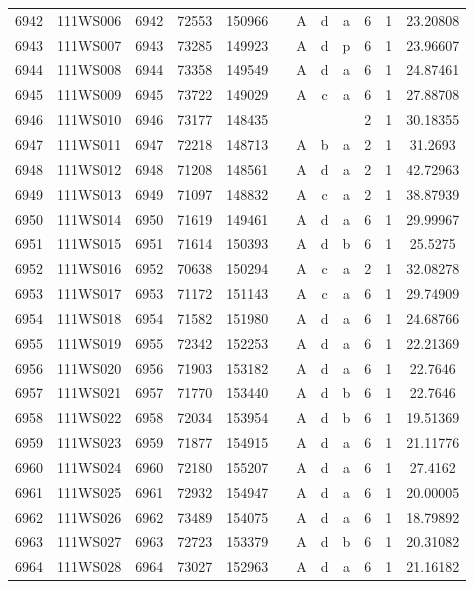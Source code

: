 \begin{tabular}{|*{12}{c|}}
6942 & 111WS006 & 6942 & 72553 & 150966 &  & A & d & a & 6 & 1 & 23.20808 \\ 
6943 & 111WS007 & 6943 & 73285 & 149923 &  & A & d & p & 6 & 1 & 23.96607 \\ 
6944 & 111WS008 & 6944 & 73358 & 149549 &  & A & d & a & 6 & 1 & 24.87461 \\ 
6945 & 111WS009 & 6945 & 73722 & 149029 &  & A & c & a & 6 & 1 & 27.88708 \\ 
6946 & 111WS010 & 6946 & 73177 & 148435 &  &  &  &  & 2 & 1 & 30.18355 \\ 
6947 & 111WS011 & 6947 & 72218 & 148713 &  & A & b & a & 2 & 1 & 31.2693 \\ 
6948 & 111WS012 & 6948 & 71208 & 148561 &  & A & d & a & 2 & 1 & 42.72963 \\ 
6949 & 111WS013 & 6949 & 71097 & 148832 &  & A & c & a & 2 & 1 & 38.87939 \\ 
6950 & 111WS014 & 6950 & 71619 & 149461 &  & A & d & a & 6 & 1 & 29.99967 \\ 
6951 & 111WS015 & 6951 & 71614 & 150393 &  & A & d & b & 6 & 1 & 25.5275 \\ 
6952 & 111WS016 & 6952 & 70638 & 150294 &  & A & c & a & 2 & 1 & 32.08278 \\ 
6953 & 111WS017 & 6953 & 71172 & 151143 &  & A & c & a & 6 & 1 & 29.74909 \\ 
6954 & 111WS018 & 6954 & 71582 & 151980 &  & A & d & a & 6 & 1 & 24.68766 \\ 
6955 & 111WS019 & 6955 & 72342 & 152253 &  & A & d & a & 6 & 1 & 22.21369 \\ 
6956 & 111WS020 & 6956 & 71903 & 153182 &  & A & d & a & 6 & 1 & 22.7646 \\ 
6957 & 111WS021 & 6957 & 71770 & 153440 &  & A & d & b & 6 & 1 & 22.7646 \\ 
6958 & 111WS022 & 6958 & 72034 & 153954 &  & A & d & b & 6 & 1 & 19.51369 \\ 
6959 & 111WS023 & 6959 & 71877 & 154915 &  & A & d & a & 6 & 1 & 21.11776 \\ 
6960 & 111WS024 & 6960 & 72180 & 155207 &  & A & d & a & 6 & 1 & 27.4162 \\ 
6961 & 111WS025 & 6961 & 72932 & 154947 &  & A & d & a & 6 & 1 & 20.00005 \\ 
6962 & 111WS026 & 6962 & 73489 & 154075 &  & A & d & a & 6 & 1 & 18.79892 \\ 
6963 & 111WS027 & 6963 & 72723 & 153379 &  & A & d & b & 6 & 1 & 20.31082 \\ 
6964 & 111WS028 & 6964 & 73027 & 152963 &  & A & d & a & 6 & 1 & 21.16182 \\ 

\end{tabular}
